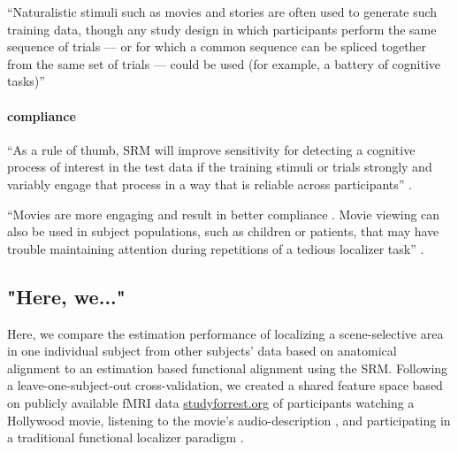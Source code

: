 %
``Naturalistic stimuli such as movies and stories are often used to generate
such training data, though any study design in which participants perform the
same sequence of trials --- or for which a common sequence can be spliced
together from the same set of trials --- could be used (for example, a battery
of cognitive tasks)'' \citep{cohen2017computational}


\paragraph{compliance}
%
``As a rule of thumb, SRM will improve sensitivity for detecting a cognitive
process of interest in the test data if the training stimuli or trials strongly
and variably engage that process in a way that is reliable across participants''
\citep{cohen2017computational}.

%
``Movies are more engaging and result in better compliance
\citep{vanderwal2015inscapes}. Movie viewing can also be used in subject
populations, such as children \citep{richardson2018development} or patients,
that may have trouble maintaining attention during repetitions of a tedious
localizer task'' \citep{jiahui2020predicting}.


\subsection{"Here, we..."}





Here, we compare the estimation performance of localizing a scene-selective area
in one individual subject from other subjects' data based on anatomical
alignment to an estimation based functional alignment using the \ac{SRM}.
Following a leave-one-subject-out cross-validation, we created a shared feature
space based on publicly available fMRI data
\href{www.studyforrest.org}{studyforrest.org} of participants watching a
Hollywood \citep{hanke2016simultaneous} movie, listening to the movie's
audio-description \citep{hanke2014audiomovie}, and participating in a
traditional functional localizer paradigm \citep{sengupta2016extension}.

